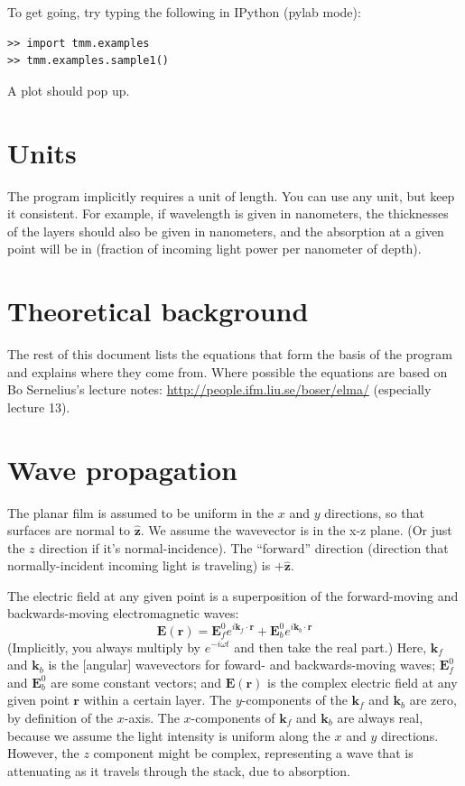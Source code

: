 \documentclass[12pt]{article}
\renewcommand{\(}{\left(}
\renewcommand{\)}{\right)}
\newcommand{\E}{\mathbf{E}}
\renewcommand{\k}{\mathbf{k}}
\renewcommand{\r}{\mathbf{r}}
\newcommand{\z}{\hat{\mathbf{z}}}
\begin{document}
To get going, try typing the following in IPython (pylab mode):

\begin{verbatim}
>> import tmm.examples
>> tmm.examples.sample1()
\end{verbatim}

A plot should pop up.

\section{Units}

The program implicitly requires a unit of length. You can use any unit, but keep it consistent. For example, if wavelength is given in nanometers, the thicknesses of the layers should also be given in nanometers, and the absorption at a given point will be in (fraction of incoming light power per nanometer of depth).

\section{Theoretical background}

The rest of this document lists the equations that form the basis of the program and explains where they come from. Where possible the equations are based on Bo Sernelius's lecture notes: \url{http://people.ifm.liu.se/boser/elma/} (especially lecture 13).

\section{Wave propagation}

The planar film is assumed to be uniform in the $x$ and $y$ directions, so that surfaces are normal to $\z$. We assume the wavevector is in the x-z plane. (Or just the $z$ direction if it's normal-incidence). The ``forward'' direction (direction that normally-incident incoming light is traveling) is $+\z$.

The electric field at any given point is a superposition of the forward-moving and backwards-moving electromagnetic waves:
$$\E(\r) = \E_f^0 e^{i\k_f\cdot\r} + \E_b^0 e^{i\k_b\cdot\r}$$
(Implicitly, you always multiply by $e^{-i\omega t}$ and  then take the real part.) Here, $\k_f$ and $\k_b$ is the [angular] wavevectors for foward- and backwards-moving waves; $\E_f^0$ and $\E_b^0$ are some constant vectors; and $\E(\r)$ is the complex electric field at any given point $\r$ within a certain layer. The $y$-components of the $\k_f$ and $\k_b$ are zero, by definition of the $x$-axis. The $x$-components of $\k_f$ and $\k_b$ are always  real, because we assume the light intensity is uniform along the $x$ and $y$ directions. However, the $z$ component might be complex, representing a wave that is attenuating as it travels through the stack, due to absorption.
\end{document}
